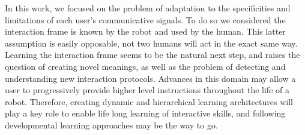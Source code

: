 In this work, we focused on the problem of adaptation to the specificities and limitations of each user's communicative signals. To do so we considered the interaction frame is known by the robot and used by the human. This latter assumption is easily opposable, not two humans will act in the exact same way. Learning the interaction frame seems to be the natural next step, and raises the question of creating novel meanings, as well as the problem of detecting and understanding new interaction protocols. Advances in this domain may allow a user to progressively provide higher level instructions throughout the life of a robot. Therefore, creating dynamic and hierarchical learning architectures will play a key role to enable life long learning of interactive skills, and following developmental learning approaches may be the way to go.









